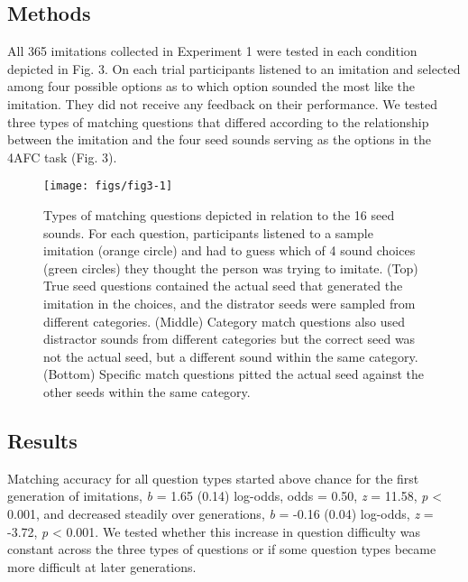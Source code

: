 \documentclass[10pt,letterpaper]{article}
\begin{document}
\subsection{Methods}\label{methods-1}

All 365 imitations collected in Experiment 1 were tested in each
condition depicted in Fig. 3. On each trial participants listened to an
imitation and selected among four possible options as to which option
sounded the most like the imitation. They did not receive any feedback
on their performance. We tested three types of matching questions that
differed according to the relationship between the imitation and the
four seed sounds serving as the options in the 4AFC task (Fig. 3).

\begin{figure}

{\centering \texttt{[image: figs/fig3-1]} 

}

\caption{Types of matching questions depicted in relation to the 16 seed sounds. For each question, participants listened to a sample imitation (orange circle) and had to guess which of 4 sound choices (green circles) they thought the person was trying to imitate. (Top) True seed questions contained the actual seed that generated the imitation in the choices, and the distrator seeds were sampled from different categories. (Middle) Category match questions also used distractor sounds from different categories but the correct seed was not the actual seed, but a different sound within the same category. (Bottom) Specific match questions pitted the actual seed against the other seeds within the same category.}\label{fig:fig3}
\end{figure}

\subsection{Results}\label{results-1}

Matching accuracy for all question types started above chance for the
first generation of imitations, \emph{b} = 1.65 (0.14) log-odds, odds =
0.50, \emph{z} = 11.58, \emph{p} \textless{} 0.001, and decreased
steadily over generations, \emph{b} = -0.16 (0.04) log-odds, \emph{z} =
-3.72, \emph{p} \textless{} 0.001. We tested whether this increase in
question difficulty was constant across the three types of questions or
if some question types became more difficult at later generations.
\end{document}
